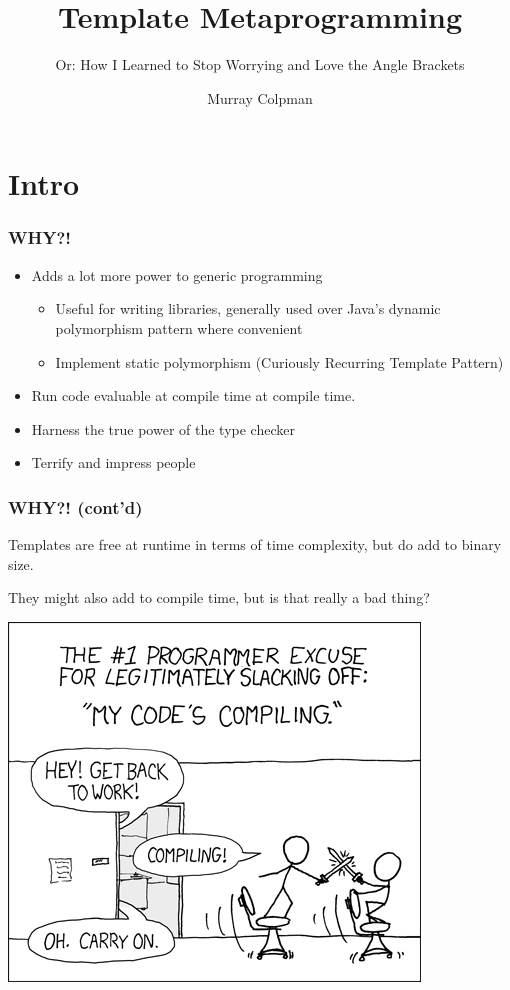 \documentclass{beamer}
\title{Template Metaprogramming}
\subtitle{Or: How I Learned to Stop Worrying and Love the Angle Brackets}
\author{Murray Colpman}
\begin{document}

  \frame{\titlepage}
  \section{Intro}
  \begin{frame}
    \frametitle{WHY?!}
    \begin{itemize}
      \pause
      \item Adds a lot more power to generic programming
        \pause
        \begin{itemize}
          \item Useful for writing libraries, generally used over Java's
            dynamic polymorphism pattern where convenient
          \pause
          \item Implement static polymorphism (Curiously Recurring Template
            Pattern)
        \end{itemize}
      \pause
      \item Run code evaluable at compile time at compile time.
      \pause
      \item Harness the true power of the type checker
      \pause
      \item Terrify and impress people
    \end{itemize}
  \end{frame}
  \begin{frame}
    \frametitle{WHY?! (cont'd)}
    Templates are free at runtime in terms of time complexity, but do add to
    binary size.
    
    \pause

    They might also add to compile time, but is that really a bad thing?

    \pause

    \includegraphics[height=0.5\textheight]{compiling} %
  \end{frame}
\end{document}
